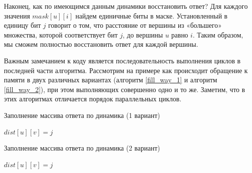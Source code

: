 \FloatBarrier
Наконец, как по имеющимся данным динамики восстановить ответ? Для каждого значения $mask[u][i]$ найдем единичные биты в маске. Установленный в единицу бит $j$ говорит о том, что расстояние от вершины из «большего» множества, которой соответствует бит $j$, до вершины $u$ равно $i$. Таким образом, мы сможем полностью восстановить ответ для каждой вершины. 

Важным замечанием к коду является последовательность выполнения циклов в последней части алгоритма. Рассмотрим на примере как происходит обращение к памяти в двух различных вариантах (алгоритм \ref{fill_way_1} и алгоритм \ref{fill_way_2}), при этом выполняющих совершенно одно и то же. Заметим, что в этих алгоритмах отличается порядок параллельных циклов. 

\FloatBarrier
\begin{algorithm}
\caption{Заполнение массива ответа по динамика (1 вариант)}\label{fill_way_1}
\begin{algorithmic}[1]

\algrenewcommand{}
\algrenewcommand{}
		\algrenewcommand{}	
				\State $dist[u][v] = j$		
			\EndIf	
		\EndFor
		\algrenewcommand{}
	\EndFor
\EndFor 
\EndProcedure
\end{algorithmic}
\end{algorithm}

\FloatBarrier
\begin{algorithm}
\caption{Заполнение массива ответа по динамика (2 вариант)}\label{fill_way_2}
\begin{algorithmic}[1]

\algrenewcommand{}
\algrenewcommand{}
		\algrenewcommand{}	
				\State $dist[u][v] = j$		
			\EndIf	
		\EndFor
		\algrenewcommand{}
	\EndFor
\EndFor 
\EndProcedure
\end{algorithmic}
\end{algorithm}
\FloatBarrier

